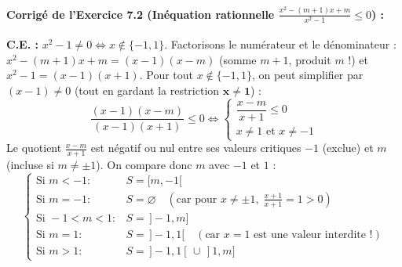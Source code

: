 \paragraph{Corrigé de l'Exercice 7.2 (Inéquation rationnelle $\frac{x^2 - (m+1)x + m}{x^2 - 1} \le 0$) :}
\textbf{C.E. :} $x^2 - 1 \neq 0 \iff x \notin \{-1, 1\}$.
Factorisons le numérateur et le dénominateur : $x^2 - (m + 1)x + m = (x - 1)(x - m)$ (somme $m + 1$, produit $m$ !) et $x^2 - 1 = (x - 1)(x + 1)$.
Pour tout $x \notin \{-1, 1\}$, on peut simplifier par $(x - 1) \neq 0$ (tout en gardant la restriction $\mathbf{x \neq 1}$) :
\[
    \frac{(x - 1)(x - m)}{(x - 1)(x + 1)} \le 0 \iff \begin{cases} \dfrac{x - m}{x + 1} \le 0 \\ x \neq 1 \text{ et } x \neq -1 \end{cases}
\]
Le quotient $\frac{x - m}{x + 1}$ est négatif ou nul entre ses valeurs critiques $-1$ (exclue) et $m$ (incluse si $m \neq \pm 1$). On compare donc $m$ avec $-1$ et $1$ :
\[
    \boxed{\begin{cases}
        \text{Si } m < -1 : & S = [m, -1[ \\
        \text{Si } m = -1 : & S = \varnothing \quad (\text{car pour } x \neq \pm 1,\; \frac{x+1}{x+1} = 1 > 0) \\
        \text{Si } -1 < m < 1 : & S = \,]-1, m] \\
        \text{Si } m = 1 : & S = \,]-1, 1[ \quad (\text{car } x = 1 \text{ est une valeur interdite !}) \\
        \text{Si } m > 1 : & S = \,]-1, 1[ \,\cup\, ]1, m]
    \end{cases}}
\]

